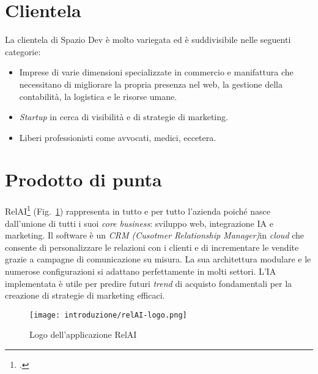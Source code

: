 \section{Clientela}
La clientela di Spazio Dev è molto variegata ed è suddivisibile nelle seguenti categorie:
\begin{itemize}
  \item Imprese di varie dimensioni specializzate in commercio e manifattura che necessitano di migliorare la propria presenza nel web, la gestione della contabilità, la logistica e le risorse umane.
  \item \emph{Startup} in cerca di visibilità e di strategie di marketing.
  \item Liberi professionisti come avvocati, medici, eccetera.
\end{itemize}



\section{Prodotto di punta}
RelAI\footcite{site:relai} (Fig.~\ref{fig:logo-RelAI}) rappresenta in tutto e per tutto l'azienda poiché nasce dall'unione di tutti i suoi \emph{core business}: sviluppo web, integrazione IA e marketing.
Il software è un \emph{CRM (Cusotmer Relationship Manager)}\glsfirstoccur  in \emph{cloud} che consente di personalizzare le relazioni con i clienti e di incrementare le vendite grazie a campagne di comunicazione su misura.
La sua architettura modulare e le numerose configurazioni si adattano perfettamente in molti settori. L'IA implementata è utile per predire futuri \emph{trend} di acquisto fondamentali per la creazione di strategie di marketing efficaci. 


\begin{figure}[!h] 
  \centering 
  \texttt{[image: introduzione/relAI-logo.png]} 
  \caption{Logo dell'applicazione RelAI}
  \label{fig:logo-RelAI}
\end{figure}


